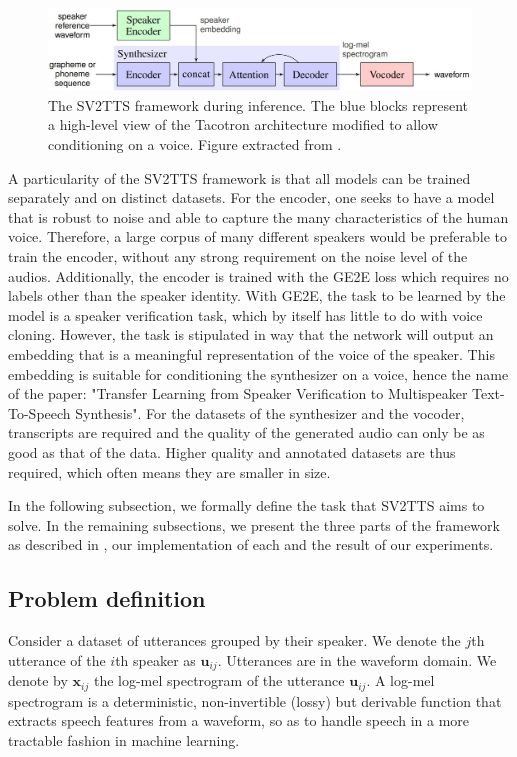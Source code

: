 \documentclass[a4paper, oneside, 12pt, english]{article}
\begin{document}
\begin{figure}[h]
	\centering
	\includegraphics[width=\linewidth]{images/sv2tts_framework.jpg}
	\caption{The SV2TTS framework during inference. The blue blocks represent a high-level view of the Tacotron architecture modified to allow conditioning on a voice. Figure extracted from \citep{SV2TTS}.}
	\label{sv2tts_framework}
\end{figure}

A particularity of the SV2TTS framework is that all models can be trained separately and on distinct datasets. For the encoder, one seeks to have a model that is robust to noise and able to capture the many characteristics of the human voice. Therefore, a large corpus of many different speakers would be preferable to train the encoder, without any strong requirement on the noise level of the audios. Additionally, the encoder is trained with the GE2E loss which requires no labels other than the speaker identity. With GE2E, the task to be learned by the model is a speaker verification task, which by itself has little to do with voice cloning. However, the task is stipulated in way that the network will output an embedding that is a meaningful representation of the voice of the speaker. This embedding is suitable for conditioning the synthesizer on a voice, hence the name of the paper: "Transfer Learning from Speaker Verification to Multispeaker Text-To-Speech Synthesis". For the datasets of the synthesizer and the vocoder, transcripts are required and the quality of the generated audio can only be as good as that of the data. Higher quality and annotated datasets are thus required, which often means they are smaller in size.

In the following subsection, we formally define the task that SV2TTS aims to solve. In the remaining subsections, we present the three parts of the framework as described in \citep{SV2TTS}, our implementation of each and the result of our experiments.

\subsection{Problem definition} \label{problem_definition}
\newcommand{\vx}{\mathbf{x}}
\newcommand{\vu}{\mathbf{u}}
\newcommand{\ve}{\mathbf{e}}
\newcommand{\vt}{\mathbf{t}}
\newcommand{\vc}{\mathbf{c}}
\newcommand{\vw}{\mathbf{w}}
\newcommand{\ms}{\mathbf{S}}
\newcommand{\enc}{\mathcal{E}}
\newcommand{\syn}{\mathcal{S}}
\newcommand{\voc}{\mathcal{V}}
Consider a dataset of utterances grouped by their speaker. We denote the $j$th utterance of the $i$th speaker as $\vu_{ij}$. Utterances are in the waveform domain. We denote by $\vx_{ij}$ the log-mel spectrogram of the utterance $\vu_{ij}$. A log-mel spectrogram is a deterministic, non-invertible (lossy) but derivable function that extracts speech features from a waveform, so as to handle speech in a more tractable fashion in machine learning.
\end{document}
